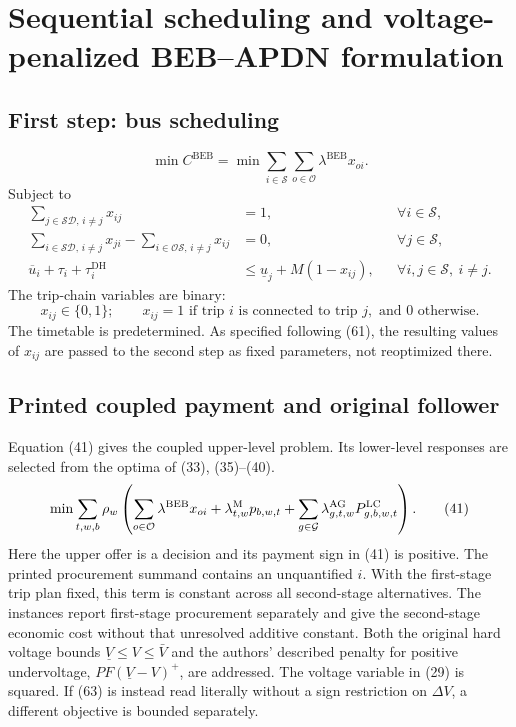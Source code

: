 \documentclass{article}
\begin{document}
\section*{Sequential scheduling and voltage-penalized BEB--APDN formulation}

\subsection*{First step: bus scheduling}
\begin{equation}
\min C^{\mathrm{BEB}}=\min\sum_{i\in\mathcal S}\sum_{o\in\mathcal O}\lambda^{\mathrm{BEB}}x_{oi}.
\tag{61}
\end{equation}
Subject to
\begin{align}
\sum_{j\in\mathcal{SD},\,i\ne j}x_{ij}&=1,
&&\forall i\in\mathcal S,\tag{7}\\
\sum_{i\in\mathcal{SD},\,i\ne j}x_{ji}-\sum_{i\in\mathcal{OS},\,i\ne j}x_{ij}&=0,
&&\forall j\in\mathcal S,\tag{8}\\
\overline u_i+\tau_i+\tau_i^{\mathrm{DH}}&\leq\underline u_j+M(1-x_{ij}),
&&\forall i,j\in\mathcal S,\ i\ne j.\tag{9}
\end{align}
The trip-chain variables are binary:
\[
x_{ij}\in\{0,1\};\qquad
x_{ij}=1\text{ if trip }i\text{ is connected to trip }j,\text{ and }0\text{ otherwise}.
\]
The timetable is predetermined. As specified following (61), the resulting values of \(x_{ij}\) are passed to the second step as fixed parameters, not reoptimized there.


\subsection*{Printed coupled payment and original follower}
Equation (41) gives the coupled upper-level problem. Its lower-level
responses are selected from the optima of (33), (35)--(40).
\begin{equation}
\min \sum_{t,w,b}\rho_w\left(\sum_{o\in\mathcal O}\lambda^{\rm BEB}x_{oi}
   +\lambda^{\rm M}_{t,w}p_{b,w,t}
   +\sum_{g\in\mathcal G}\lambda^{\rm AG}_{g,t,w}P^{\rm LC}_{g,b,w,t}\right).\tag{41}
\end{equation}
Here the upper offer is a decision and its payment sign in (41) is positive.
The printed procurement summand contains an unquantified \(i\). With the
first-stage trip plan fixed, this term is constant across all second-stage
alternatives. The instances report first-stage procurement separately and
give the second-stage economic cost without that unresolved additive constant.
Both the original hard voltage bounds \(\underline V\le V\le\bar V\) and the
authors' described penalty for positive undervoltage, \(PF(\underline V-V)^+\),
are addressed. The voltage variable in (29) is squared. If (63) is instead
read literally without a sign restriction on \(\Delta V\), a different
objective is bounded separately.
\end{document}
